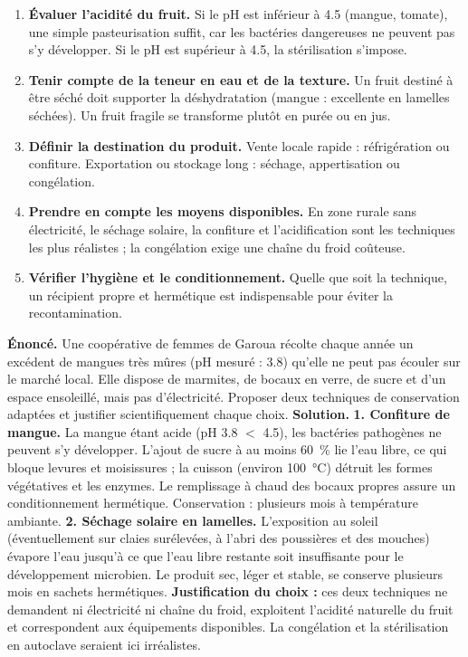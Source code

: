 \documentclass[11pt]{article}
\begin{document}
\begin{methode}
\begin{enumerate}
\item \textbf{Évaluer l'acidité du fruit.} Si le pH est inférieur à \num{4,5} (mangue, tomate), une simple pasteurisation suffit, car les bactéries dangereuses ne peuvent pas s'y développer. Si le pH est supérieur à \num{4,5}, la stérilisation s'impose.
\item \textbf{Tenir compte de la teneur en eau et de la texture.} Un fruit destiné à être séché doit supporter la déshydratation (mangue : excellente en lamelles séchées). Un fruit fragile se transforme plutôt en purée ou en jus.
\item \textbf{Définir la destination du produit.} Vente locale rapide : réfrigération ou confiture. Exportation ou stockage long : séchage, appertisation ou congélation.
\item \textbf{Prendre en compte les moyens disponibles.} En zone rurale sans électricité, le séchage solaire, la confiture et l'acidification sont les techniques les plus réalistes ; la congélation exige une chaîne du froid coûteuse.
\item \textbf{Vérifier l'hygiène et le conditionnement.} Quelle que soit la technique, un récipient propre et hermétique est indispensable pour éviter la recontamination.
\end{enumerate}
\end{methode}

\begin{exoresolu}
\textbf{Énoncé.} Une coopérative de femmes de Garoua récolte chaque année un excédent de mangues très mûres (pH mesuré : \num{3,8}) qu'elle ne peut pas écouler sur le marché local. Elle dispose de marmites, de bocaux en verre, de sucre et d'un espace ensoleillé, mais pas d'électricité. Proposer deux techniques de conservation adaptées et justifier scientifiquement chaque choix.
\tcblower
\textbf{Solution.} \textbf{1. Confiture de mangue.} La mangue étant acide (pH \num{3,8} $<$ \num{4,5}), les bactéries pathogènes ne peuvent s'y développer. L'ajout de sucre à au moins \SI{60}{\%} lie l'eau libre, ce qui bloque levures et moisissures ; la cuisson (environ \SI{100}{\celsius}) détruit les formes végétatives et les enzymes. Le remplissage à chaud des bocaux propres assure un conditionnement hermétique. Conservation : plusieurs mois à température ambiante. \textbf{2. Séchage solaire en lamelles.} L'exposition au soleil (éventuellement sur claies surélevées, à l'abri des poussières et des mouches) évapore l'eau jusqu'à ce que l'eau libre restante soit insuffisante pour le développement microbien. Le produit sec, léger et stable, se conserve plusieurs mois en sachets hermétiques. \textbf{Justification du choix :} ces deux techniques ne demandent ni électricité ni chaîne du froid, exploitent l'acidité naturelle du fruit et correspondent aux équipements disponibles. La congélation et la stérilisation en autoclave seraient ici irréalistes.
\end{exoresolu}
\end{document}
